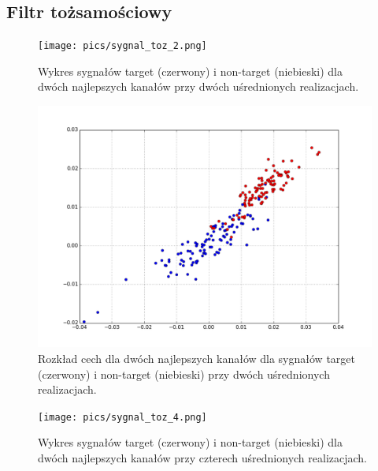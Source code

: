 \documentclass[licencjacka,openright]{pracamgr}
\begin{document}
\subsection{Filtr tożsamościowy}

\begin{figure}[H]
\centering
\texttt{[image: pics/sygnal\_toz\_2.png]}
\caption{Wykres sygnałów target (czerwony) i non-target (niebieski) dla dwóch najlepszych kanałów przy dwóch uśrednionych realizacjach.}
\label{sygnal_toz_2}
\end{figure}

\begin{figure}[H]
\centering
\includegraphics[scale=0.55, trim=0mm 0mm 0mm 0mm, clip=True]{pics/cecha_toz_2.png}
\caption{Rozkład cech dla dwóch najlepszych kanałów dla sygnałów target (czerwony) i non-target (niebieski) przy dwóch uśrednionych realizacjach.}
\label{cecha_toz_2}
\end{figure}

\begin{figure}[H]
\centering
\texttt{[image: pics/sygnal\_toz\_4.png]}
\caption{Wykres sygnałów target (czerwony) i non-target (niebieski) dla dwóch najlepszych kanałów przy czterech uśrednionych realizacjach.}
\label{sygnal_toz_4}
\end{figure}
\end{document}
